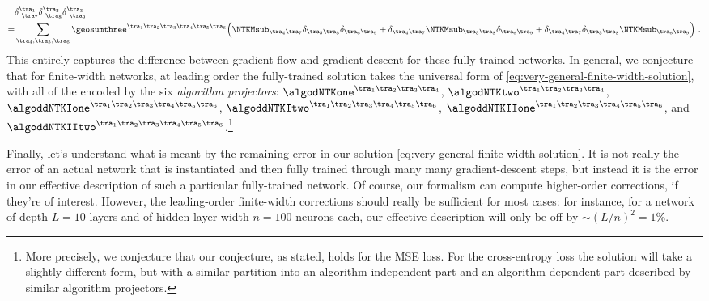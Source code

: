 \begin{align}\label{eq:ODE-X-III}
&\delta^{\tra_1}_{\ \tra_7}\delta^{\tra_2}_{\ \tra_8}\delta^{\tra_3}_{\ \tra_9}\,  \\
 =&\sum_{\tra_4,\tra_5,\tra_6}\geosumthree^{\tra_1\tra_2\tra_3\tra_4\tra_5\tra_6}  \Big(\NTKMsub_{\tra_4\tra_7}\delta_{\tra_5\tra_8}\delta_{\tra_6\tra_9} +\delta_{\tra_4\tra_7}\NTKMsub_{\tra_5\tra_8}\delta_{\tra_6\tra_9} +  \delta_{\tra_4\tra_7}\delta_{\tra_5\tra_8}\NTKMsub_{\tra_6\tra_9} \Big)\notag \,  \, . 
\end{align}
This entirely captures the difference between gradient flow and gradient descent for these fully-trained networks.
In general, we conjecture that for finite-width networks, at leading order the fully-trained solution takes the universal form of \eqref{eq:very-general-finite-width-solution}, with all of the  encoded by the  six \emph{algorithm projectors}: $\algodNTKone^{\tra_1\tra_2\tra_3\tra_4}$, $\algodNTKtwo^{\tra_1\tra_2\tra_3\tra_4}$, $\algoddNTKIone^{\tra_1\tra_2\tra_3\tra_4\tra_5\tra_6}$, $\algoddNTKItwo^{\tra_1\tra_2\tra_3\tra_4\tra_5\tra_6}$, $\algoddNTKIIone^{\tra_1\tra_2\tra_3\tra_4\tra_5\tra_6}$, and $\algoddNTKIItwo^{\tra_1\tra_2\tra_3\tra_4\tra_5\tra_6}$.\footnote{
More precisely, we conjecture that our conjecture, as stated, holds for the MSE loss. For the cross-entropy loss the solution will take a slightly different form, but with a similar partition into an algorithm-independent part and an algorithm-dependent part described by similar algorithm projectors.
}




Finally, let's understand what is meant by the remaining error in our solution \eqref{eq:very-general-finite-width-solution}. It is not really the error of an actual network that is instantiated and then fully trained through many many gradient-descent steps, but instead it is the error in our effective description of such a particular fully-trained network. Of course, our  formalism can compute higher-order corrections, if they're of interest. However, the leading-order finite-width corrections should really be sufficient for most cases: for instance, for a network of depth $L=10$ layers and of hidden-layer width $n=100$ neurons each, our effective description will only be off by $\sim(L/n)^2= 1\%$.

